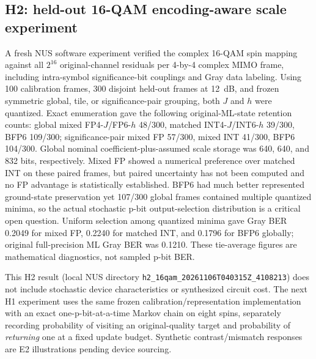 \documentclass[11pt,a4paper]{article}
\begin{document}
\subsection{H2: held-out 16-QAM encoding-aware scale experiment}
A fresh NUS software experiment verified the complex 16-QAM
spin mapping against all $2^{16}$ original-channel residuals
per 4-by-4 complex MIMO frame, including intra-symbol
significance-bit couplings and Gray data labeling.
Using 100 calibration frames, 300 disjoint held-out frames
at 12~dB, and frozen symmetric global, tile, or
significance-pair grouping, both $J$ and $h$ were quantized.
Exact enumeration gave the following original-ML-state
retention counts: global mixed FP4-$J$/FP6-$h$ 48/300,
matched INT4-$J$/INT6-$h$ 39/300, BFP6 109/300;
significance-pair mixed FP 57/300, mixed INT 41/300,
BFP6 104/300. Global nominal coefficient-plus-assumed
scale storage was 640, 640, and 832 bits, respectively.
Mixed FP showed a numerical preference over matched
INT on these paired frames, but paired uncertainty
has not been computed and no FP advantage is
statistically established. BFP6 had much better
represented ground-state preservation yet 107/300
global frames contained multiple quantized minima,
so the actual stochastic p-bit output-selection
distribution is a critical open question. Uniform
selection among quantized minima gave Gray BER
0.2049 for mixed FP, 0.2240 for matched INT,
and 0.1796 for BFP6 globally; original full-precision
ML Gray BER was 0.1210. These tie-average figures
are mathematical diagnostics, not sampled p-bit BER.

This H2 result (local NUS directory
\texttt{h2\_16qam\_20261106T040315Z\_4108213})
does not include stochastic device characteristics
or synthesized circuit cost. The next H1 experiment
uses the same frozen calibration/representation
implementation with an exact one-p-bit-at-a-time
Markov chain on eight spins, separately recording
probability of visiting an original-quality target
and probability of \emph{returning} one at a
fixed update budget. Synthetic contrast/mismatch
responses are E2 illustrations pending device sourcing.
\end{document}
